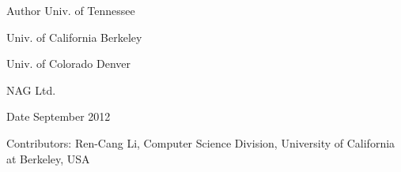\begin{DoxyAuthor}{Author}
Univ. of Tennessee 

Univ. of California Berkeley 

Univ. of Colorado Denver 

N\+A\+G Ltd. 
\end{DoxyAuthor}
\begin{DoxyDate}{Date}
September 2012 
\end{DoxyDate}
\begin{DoxyParagraph}{Contributors\+: }
Ren-\/\+Cang Li, Computer Science Division, University of California at Berkeley, U\+S\+A 
\end{DoxyParagraph}

